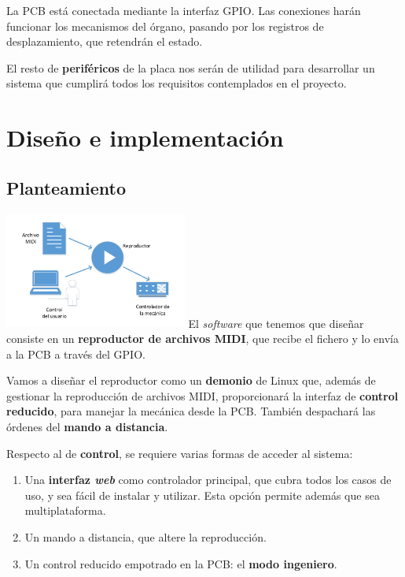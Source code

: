 \documentclass[10pt,a4paper]{article}
\begin{document}
	La PCB está conectada mediante la interfaz GPIO. Las conexiones harán funcionar los mecanismos del órgano, pasando por los registros de desplazamiento, que retendrán el estado.
	
	El resto de \textbf{periféricos} de la placa nos serán de utilidad para desarrollar un sistema que cumplirá todos los requisitos contemplados en el proyecto.
	
	
	\section{Diseño e implementación}
	
	\subsection{Planteamiento}
	
	\begin{multicols}{2}
		\noindent
		\includegraphics[width=0.45\textwidth]{images/idea} 
		\columnbreak
		El \textit{software} que tenemos que diseñar consiste en un \textbf{reproductor de archivos MIDI}, que recibe el fichero y lo envía a la PCB a través del GPIO.
		
		Vamos a diseñar el reproductor como un \textbf{demonio} de Linux que, además de gestionar la reproducción de archivos MIDI, proporcionará la interfaz de \textbf{control reducido}, para manejar la mecánica desde la PCB. También despachará las órdenes del \textbf{mando a distancia}.
	\end{multicols}
	
	Respecto al de \textbf{control}, se requiere varias formas de acceder al sistema:
	
	\begin{enumerate}
		\item Una \textbf{interfaz \textit{web}} como controlador principal, que cubra todos los casos de uso, y sea fácil de instalar y utilizar. Esta opción permite además que sea multiplataforma.
		
		\item Un mando a distancia, que altere la reproducción.
		
		\item Un control reducido empotrado en la PCB: el \textbf{modo ingeniero}.
	\end{enumerate}
	
\end{document}
